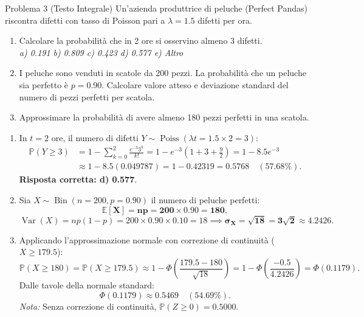 \documentclass[11pt,a4paper]{article}
\newcommand{\EE}{\mathbb{E}}
\newcommand{\Prob}{\mathbb{P}}
\newcommand{\Var}{\operatorname{Var}}
\begin{document}
\begin{problemabox}{Problema 3 (Testo Integrale)}
Un'azienda produttrice di peluche (Perfect Pandas) riscontra difetti con tasso di Poisson pari a $\lambda = 1.5$ difetti per ora.
\begin{enumerate}[label=(\alph*)]
    \item Calcolare la probabilità che in 2 ore si osservino almeno 3 difetti.\\
    \emph{a) 0.191 \quad b) 0.809 \quad c) 0.423 \quad d) 0.577 \quad e) Altro}
    \item I peluche sono venduti in scatole da 200 pezzi. La probabilità che un peluche sia perfetto è $p = 0.90$. Calcolare valore atteso e deviazione standard del numero di pezzi perfetti per scatola.
    \item Approssimare la probabilità di avere almeno 180 pezzi perfetti in una scatola.
\end{enumerate}
\end{problemabox}

\begin{soluzionebox}
\begin{enumerate}[label=(\alph*)]
    \item In $t = 2$ ore, il numero di difetti $Y \sim \operatorname{Poiss}(\lambda t = 1.5 \times 2 = 3)$:
    \begin{align*}
    \Prob(Y \ge 3) &= 1 - \sum_{k=0}^2 \frac{e^{-3} 3^k}{k!} = 1 - e^{-3}\left(1 + 3 + \frac{9}{2}\right) = 1 - 8.5 e^{-3} \\
    &\approx 1 - 8.5(0.049787) = 1 - 0.42319 = \mathbf{0.5768} \quad (\mathbf{57.68\%}).
    \end{align*}
    \textbf{Risposta corretta: d) 0.577}.

    \item Sia $X \sim \operatorname{Bin}(n=200, p=0.90)$ il numero di peluche perfetti:
    \[
    \mathbf{\EE[X] = np = 200 \times 0.90 = 180},
    \]
    \[
    \Var(X) = np(1-p) = 200 \times 0.90 \times 0.10 = 18 \implies \mathbf{\sigma_X = \sqrt{18} = 3\sqrt{2} \approx 4.2426}.
    \]

    \item Applicando l'approssimazione normale con correzione di continuità ($X \ge 179.5$):
    \[
    \Prob(X \ge 180) = \Prob(X \ge 179.5) \approx 1 - \Phi\left( \frac{179.5 - 180}{\sqrt{18}} \right) = 1 - \Phi\left( \frac{-0.5}{4.2426} \right) = \Phi(0.1179).
    \]
    Dalle tavole della normale standard:
    \[
    \Phi(0.1179) \approx \mathbf{0.5469} \quad (\mathbf{54.69\%}).
    \]
    \emph{Nota:} Senza correzione di continuità, $\Prob(Z \ge 0) = 0.5000$.
\end{enumerate}
\end{soluzionebox}
\end{document}
